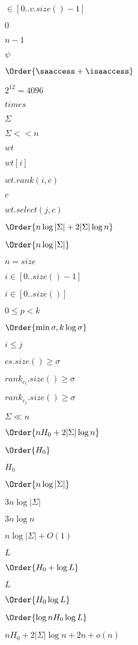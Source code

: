 \documentclass{article}
\begin{document}
$\in [0..v.size()-1]$
\pagebreak

$0$
\pagebreak

$n-1$
\pagebreak

$\psi$
\pagebreak

$ \Order{\saaccess+\isaaccess} $
\pagebreak

$ 2^{12}=4096 $
\pagebreak

$times$
\pagebreak

$\Sigma$
\pagebreak

$\Sigma << n$
\pagebreak

$wt$
\pagebreak

$wt[i]$
\pagebreak

$wt.rank(i,c)$
\pagebreak

$c$
\pagebreak

$wt.select(j,c)$
\pagebreak

$\Order{n\log|\Sigma| + 2|\Sigma|\log n}$
\pagebreak

$ \Order{n\log|\Sigma|}$
\pagebreak

$n=size$
\pagebreak

$i \in [0..size()-1]$
\pagebreak

$i\in[0..size()]$
\pagebreak

$ 0 \leq p < k $
\pagebreak

$ \Order{\min{\sigma, k \log \sigma}} $
\pagebreak

$ i\leq j $
\pagebreak

$ cs.size() \geq \sigma $
\pagebreak

$ rank_c_i.size() \geq \sigma $
\pagebreak

$ rank_c_j.size() \geq \sigma $
\pagebreak

$\Sigma \ll n$
\pagebreak

$\Order{n H_0 + 2|\Sigma|\log n}$
\pagebreak

$ \Order{H_0} $
\pagebreak

$ H_0 $
\pagebreak

$\Order{n\log|\Sigma|}$
\pagebreak

$ 3n\log|\Sigma| $
\pagebreak

$3n\log n $
\pagebreak

$ n\log|\Sigma| + O(1)$
\pagebreak

$ L $
\pagebreak

$ \Order{H_0 + \log L} $
\pagebreak

$L$
\pagebreak

$ \Order{H_0 \log L} $
\pagebreak

$ \Order{\log n H_0 \log L} $
\pagebreak

$ nH_0 + 2|\Sigma|\log n + 2n + o(n) $
\pagebreak
\end{document}
